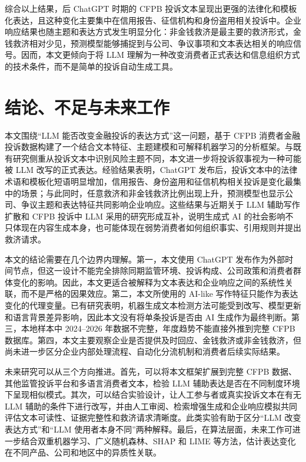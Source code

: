 \documentclass[UTF8]{ctexart}
\begin{document}
综合以上结果，后 ChatGPT 时期的 CFPB 投诉文本呈现出更强的法律化和模板化表达，且这种变化主要集中在信用报告、征信机构和身份盗用相关投诉中。企业响应结果也随主题和表达方式发生明显分化：非金钱救济是最主要的救济形式，金钱救济相对少见，预测模型能够捕捉到与公司、争议事项和文本表达相关的响应信号。因而，本文更倾向于将 LLM 理解为一种改变消费者正式表达和信息组织方式的技术条件，而不是简单的投诉自动生成工具。

\section{结论、不足与未来工作}

本文围绕“LLM 能否改变金融投诉的表达方式”这一问题，基于 CFPB 消费者金融投诉数据构建了一个结合文本特征、主题建模和可解释机器学习的分析框架。与既有研究侧重从投诉文本中识别风险主题不同\cite{bastani2019lda,bhattacharya2024shortchanged}，本文进一步将投诉叙事视为一种可能被 LLM 改写的正式表达。经验结果表明，ChatGPT 发布后，投诉文本中的法律术语和模板化短语明显增加，信用报告、身份盗用和征信机构相关投诉是变化最集中的场景；与此同时，任意救济和非金钱救济比例出现上升，预测模型也显示公司、争议主题和表达特征共同影响企业响应。这些结果与近期关于 LLM 辅助写作扩散和 CFPB 投诉中 LLM 采用的研究形成互补\cite{shin2026llmcomplaints,liang2025widespread}，说明生成式 AI 的社会影响不只体现在内容生成本身，也可能体现在弱势消费者如何组织事实、引用规则并提出救济请求。

本文的结论需要在几个边界内理解。第一，本文使用 ChatGPT 发布作为外部时间节点，但这一设计不能完全排除同期监管环境、投诉构成、公司政策和消费者群体变化的影响。因此，本文更适合被解释为文本表达和企业响应之间的系统性关联，而不是严格的因果效应。第二，本文所使用的 AI-like 写作特征只能作为表达变化的代理变量。已有研究表明，机器生成文本检测方法可能受到改写、模型更新和语言背景差异影响\cite{mitchell2023detectgpt,sadasivan2023detection,liang2023detectorsbias}，因此本文没有将单条投诉是否由 AI 生成作为最终判断。第三，本地样本中 2024--2026 年数据不完整，年度趋势不能直接外推到完整 CFPB 数据库。第四，本文主要观察企业是否提供及时回应、金钱救济或非金钱救济，但尚未进一步区分企业内部处理流程、自动化分流机制和消费者后续实际结果。

未来研究可以从三个方向推进。首先，可以将本文框架扩展到完整 CFPB 数据、其他监管投诉平台和多语言消费者文本，检验 LLM 辅助表达是否在不同制度环境下呈现相似模式。其次，可以结合实验设计，让人工参与者或真实投诉文本在有无 LLM 辅助的条件下进行改写，并由人工审阅、检索增强生成和企业响应模拟共同评估文本可读性、证据完整性和救济请求清晰度。此类实验有助于区分“LLM 改变表达方式”和“LLM 使用者本身不同”两种解释。最后，在算法层面，未来工作可进一步结合双重机器学习、广义随机森林、SHAP 和 LIME 等方法，估计表达变化在不同产品、公司和地区中的异质性关联\cite{chernozhukov2018dml,athey2019grf,lundberg2017shap,ribeiro2016lime}。
\end{document}
